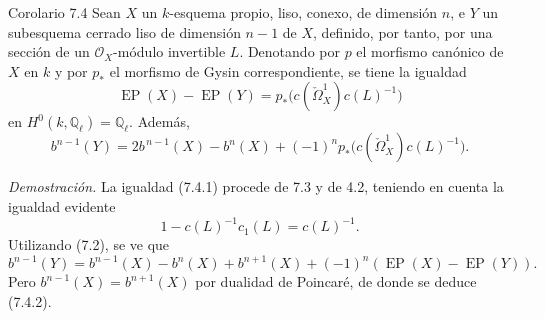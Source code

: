 \begin{statement}{Corolario 7.4}
Sean $X$ un $k$-esquema propio, liso, conexo, de dimensión $n$, e $Y$ un subesquema cerrado liso de dimensión $n-1$ de $X$, definido, por tanto, por una sección de un $\mathcal O_X$-módulo invertible $L$. Denotando por $p$ el morfismo canónico de $X$ en $k$ y por $p_*$ el morfismo de Gysin correspondiente, se tiene la igualdad
\[
\operatorname{EP}(X)-\operatorname{EP}(Y)=p_*\bigl(c(\check\Omega_X^1)c(L)^{-1}\bigr)
\tag{7.4.1}
\]
en $H^0(k,\mathbb Q_\ell)=\mathbb Q_\ell$. Además,
\[
b^{n-1}(Y)=2b^{\,n-1}(X)-b^n(X)+(-1)^n p_*\bigl(c(\check\Omega_X^1)c(L)^{-1}\bigr).
\tag{7.4.2}
\]
\end{statement}

\emph{Demostración.} La igualdad (7.4.1) procede de 7.3 y de 4.2, teniendo en cuenta la igualdad evidente
\[
1-c(L)^{-1}c_1(L)=c(L)^{-1}.
\]
Utilizando (7.2), se ve que
\[
b^{n-1}(Y)=b^{n-1}(X)-b^n(X)+b^{n+1}(X)+(-1)^n(\operatorname{EP}(X)-\operatorname{EP}(Y)).
\]
Pero $b^{n-1}(X)=b^{n+1}(X)$ por dualidad de Poincaré, de donde se deduce (7.4.2).
